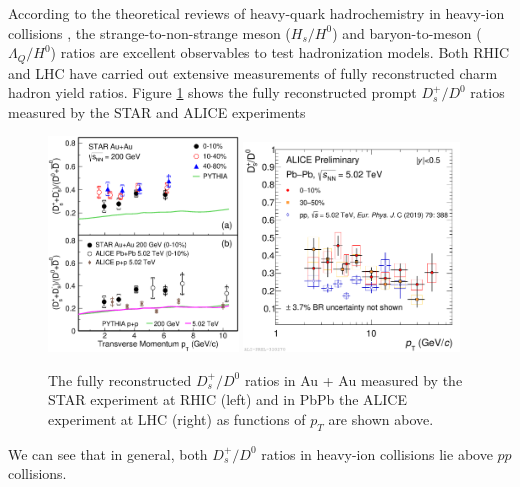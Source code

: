 According to the theoretical reviews of heavy-quark hadrochemistry in heavy-ion collisions \cite{StrangetoLight,BaryontoMeson}, the strange-to-non-strange meson ($H_s/H^0$) and baryon-to-meson ($\Lambda_{Q}/H^{0}$) ratios are excellent observables to test hadronization models. Both RHIC and LHC have carried out extensive measurements of fully reconstructed charm hadron yield ratios. Figure \ref{HadroPlotCharm} shows the fully reconstructed prompt $D^+_s/D^0$ ratios measured by the STAR \cite{STARDsD0Ref} and ALICE \cite{ALICEDsD0Ref} experiments


\begin{figure}[hbtp]
\begin{center}
\includegraphics[width=0.45\textwidth]{Figures/Chapter2/STARDsD0.eps}
\includegraphics[width=0.51\textwidth]{Figures/Chapter2/ALICEDsD0.pdf}
\caption{The fully reconstructed $D_s^+/D^0$ ratios in Au + Au measured by the STAR experiment at RHIC (left) and in PbPb the ALICE experiment at LHC (right) as functions of $p_T$ are shown above.}
\label{HadroPlotCharm}
\end{center}
\end{figure}   


We can see that in general, both $D_s^+/D^0$ ratios in heavy-ion collisions lie above $pp$ collisions.

